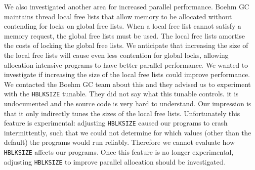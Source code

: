 We also investigated another area for increased parallel performance.
Boehm GC maintains thread local free lists that allow memory to be allocated
without contending for locks on global free lists.
When a local free list cannot satisfy a memory request, the global free
lists must be used.
The local free lists amortise the costs of locking the global free lists.
We anticipate that increasing the size of the local free lists will cause even
less contention for global locks,
allowing allocation intensive programs to have better parallel
performance.
We wanted to investigate if increasing the size of the local free lists could
improve performance.
We contacted the Boehm GC team about this and they advised us to experiment
with the \texttt{HBLKSIZE} tunable.
They did not say what this tunable controls.
it is undocumented and the source code is very hard to understand.
Our impression is that it only indirectly tunes the sizes of the local free
lists.
Unfortunately this feature is experimental:
adjusting \texttt{HBLKSIZE} caused our programs to crash intermittently,
such that we could not determine for which values (other than the default) 
the programs would run reliably.
Therefore we cannot evaluate how \texttt{HBLKSIZE} affects our
programs.
Once this feature is no longer experimental,
adjusting \texttt{HBLKSIZE} to improve parallel allocation should be
investigated.


